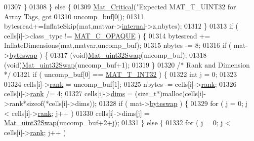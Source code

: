 \begin{DoxyCode}
{{{{{{{01307                \}
01308             \} \textcolor{keywordflow}{else} \{
01309                 \hyperlink{group__mat__util_gaf51f2bfbb5580f575e4dd79757e2b80c}{Mat\_Critical}(\textcolor{stringliteral}{"Expected MAT\_T\_UINT32 for Array Tags, got %
01310                                uncomp\_buf[0]);
01311                 bytesread+=InflateSkip(mat,matvar->\hyperlink{group___m_a_t_a6e97e3ed9f40c49322c18561c2a94e92}{internal}->z,nbytes);
01312             \}
01313             \textcolor{keywordflow}{if} ( cells[i]->class\_type != \hyperlink{group___m_a_t_ggad4d60ae7b709fc81bfd744fb4c857c40ad83c684d250e463c1a3779647695c0c9}{MAT\_C\_OPAQUE} ) \{
01314                 bytesread += InflateDimensions(mat,matvar,uncomp\_buf);
01315                 nbytes -= 8;
01316                 \textcolor{keywordflow}{if} ( mat->\hyperlink{struct__mat__t_a99d207977af5e04941ace56d71817a40}{byteswap} ) \{
01317                     (void)\hyperlink{endian_8c_a8cb0d0750e2eaf9840d95db531934f4f}{Mat\_uint32Swap}(uncomp\_buf);
01318                     (void)\hyperlink{endian_8c_a8cb0d0750e2eaf9840d95db531934f4f}{Mat\_uint32Swap}(uncomp\_buf+1);
01319                 \}
01320                 \textcolor{comment}{/* Rank and Dimension */}
01321                 \textcolor{keywordflow}{if} ( uncomp\_buf[0] == \hyperlink{group___m_a_t_ggacf7b3b879282b7ab3a51190e49bf3453a83e06a68320726c6572bfbb9f3addb1d}{MAT\_T\_INT32} ) \{
01322                     \textcolor{keywordtype}{int} j = 0;
01323 
01324                     cells[i]->\hyperlink{group___m_a_t_a84ba70c96ded13cc555fa75b768d9921}{rank} = uncomp\_buf[1];
01325                     nbytes -= cells[i]->\hyperlink{group___m_a_t_a84ba70c96ded13cc555fa75b768d9921}{rank};
01326                     cells[i]->\hyperlink{group___m_a_t_a84ba70c96ded13cc555fa75b768d9921}{rank} /= 4;
01327                     cells[i]->\hyperlink{group___m_a_t_a8e01234e1c862ce3472bb37f5a09b92c}{dims} = (\textcolor{keywordtype}{size\_t}*)malloc(cells[i]->rank*\textcolor{keyword}{sizeof}(*cells[i]->dims));
01328                     \textcolor{keywordflow}{if} ( mat->\hyperlink{struct__mat__t_a99d207977af5e04941ace56d71817a40}{byteswap} ) \{
01329                         \textcolor{keywordflow}{for} ( j = 0; j < cells[i]->\hyperlink{group___m_a_t_a84ba70c96ded13cc555fa75b768d9921}{rank}; j++ )
01330                             cells[i]->dims[j] = \hyperlink{endian_8c_a8cb0d0750e2eaf9840d95db531934f4f}{Mat\_uint32Swap}(uncomp\_buf+2+j);
01331                     \} \textcolor{keywordflow}{else} \{
01332                         \textcolor{keywordflow}{for} ( j = 0; j < cells[i]->\hyperlink{group___m_a_t_a84ba70c96ded13cc555fa75b768d9921}{rank}; j++ )
}}}}}}}}
\end{DoxyCode}
